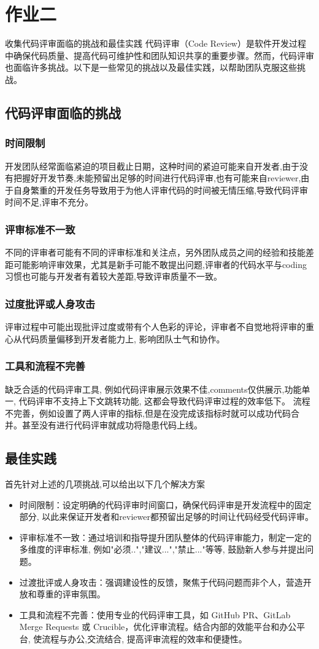 \documentclass{article}
\begin{document}
\section{作业二}
收集代码评审面临的挑战和最佳实践  
代码评审（Code Review）是软件开发过程中确保代码质量、提高代码可维护性和团队知识共享的重要步骤。然而，代码评审也面临许多挑战。以下是一些常见的挑战以及最佳实践，以帮助团队克服这些挑战。
\subsection{代码评审面临的挑战}
\subsubsection{时间限制}
开发团队经常面临紧迫的项目截止日期，这种时间的紧迫可能来自开发者,由于没有把握好开发节奏,未能预留出足够的时间进行代码评审,也有可能来自reviewer,由于自身繁重的开发任务导致用于为他人评审代码的时间被无情压缩,导致代码评审时间不足,评审不充分。
\subsubsection{评审标准不一致}
不同的评审者可能有不同的评审标准和关注点，另外团队成员之间的经验和技能差距可能影响评审效果，尤其是新手可能不敢提出问题,评审者的代码水平与coding习惯也可能与开发者有着较大差距,导致评审质量不一致。
\subsubsection{过度批评或人身攻击}
评审过程中可能出现批评过度或带有个人色彩的评论，评审者不自觉地将评审的重心从代码质量偏移到开发者能力上, 影响团队士气和协作。
\subsubsection{工具和流程不完善}
缺乏合适的代码评审工具, 例如代码评审展示效果不佳,comments仅供展示,功能单一, 代码评审不支持上下文跳转功能, 这都会导致代码评审过程的效率低下。
流程不完善，例如设置了两人评审的指标,但是在没完成该指标时就可以成功代码合并。甚至没有进行代码评审就成功将隐患代码上线。

\subsection{最佳实践}
首先针对上述的几项挑战,可以给出以下几个解决方案
\begin{itemize}
        \item 时间限制：设定明确的代码评审时间窗口，确保代码评审是开发流程中的固定部分, 以此来保证开发者和reviewer都预留出足够的时间让代码经受代码评审。
        \item 评审标准不一致：通过培训和指导提升团队整体的代码评审能力，制定一定的多维度的评审标准, 例如"必须..","建议...","禁止..."等等, 鼓励新人参与并提出问题。
        \item 过渡批评或人身攻击：强调建设性的反馈，聚焦于代码问题而非个人，营造开放和尊重的评审氛围。
        \item 工具和流程不完善：使用专业的代码评审工具，如 GitHub PR、GitLab Merge Requests 或 Crucible，优化评审流程。结合内部的效能平台和办公平台, 使流程与办公,交流结合, 提高评审流程的效率和便捷性。
\end{itemize}
\end{document}
